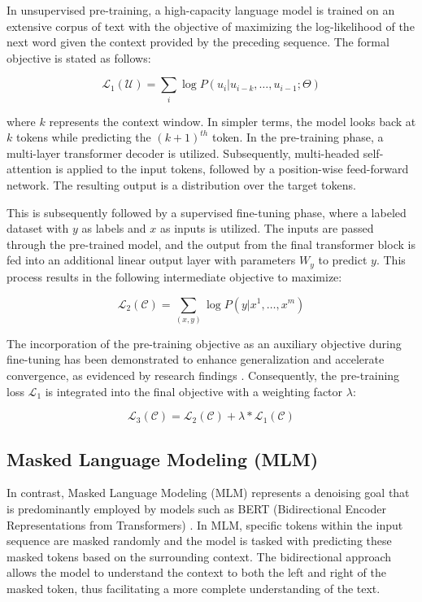In unsupervised pre-training, a high-capacity language model is trained on an extensive corpus of text with the objective of maximizing the log-likelihood of the next word given the context provided by the preceding sequence. The formal objective is stated as follows:

\begin{equation}
    \mathcal{L}_1(\mathcal{U}) = \sum_{i} \log P(u_i | u_{i-k}, \ldots, u_{i-1}; \Theta)
\end{equation}

where \( k \) represents the context window. In simpler terms, the model looks back at \( k \) tokens while predicting the \((k+1)^{th}\) token. In the pre-training phase, a multi-layer transformer decoder is utilized. Subsequently, multi-headed self-attention is applied to the input tokens, followed by a position-wise feed-forward network. The resulting output is a distribution over the target tokens.

This is subsequently followed by a supervised fine-tuning phase, where a labeled dataset with \( y \) as labels and \( x \) as inputs is utilized. The inputs are passed through the pre-trained model, and the output from the final transformer block is fed into an additional linear output layer with parameters \( W_y \) to predict \( y \). This process results in the following intermediate objective to maximize:

\begin{equation}
    \mathcal{L}_2(\mathcal{C}) = \sum_{(x,y)} \log P(y | x^1, \ldots, x^m)
\end{equation}

The incorporation of the pre-training objective as an auxiliary objective during fine-tuning has been demonstrated to enhance generalization and accelerate convergence, as evidenced by research findings \cite{radford2018improving}. Consequently, the pre-training loss \( \mathcal{L}_1 \) is integrated into the final objective with a weighting factor \( \lambda \):

\begin{equation}
    \mathcal{L}_3(\mathcal{C}) = \mathcal{L}_2(\mathcal{C}) + \lambda \ast \mathcal{L}_1(\mathcal{C})
\end{equation}
 
\subsection{Masked Language Modeling (MLM)}

In contrast, Masked Language Modeling (MLM) represents a denoising goal that is predominantly employed by models such as BERT (Bidirectional Encoder Representations from Transformers) \cite{devlin2018bert}. In MLM, specific tokens within the input sequence are masked randomly and the model is tasked with predicting these masked tokens based on the surrounding context. The bidirectional approach allows the model to understand the context to both the left and right of the masked token, thus facilitating a more complete understanding of the text.


